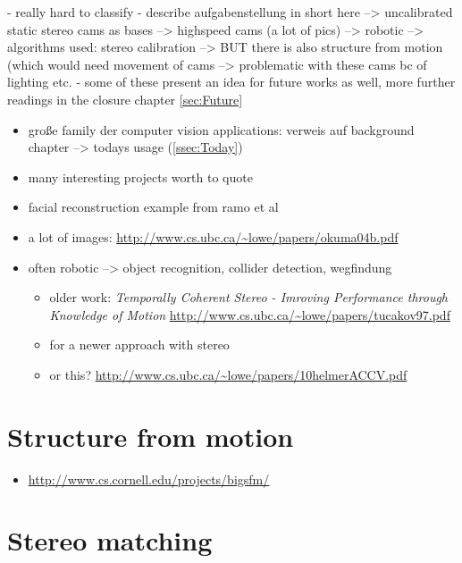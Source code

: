 - really hard to classify
- describe aufgabenstellung in short here --> uncalibrated  static stereo cams as bases --> highspeed cams (a lot of pics) --> robotic --> algorithms used: stereo calibration --> BUT there is also structure from motion (which would need movement of cams --> problematic with these cams bc of lighting etc. 
- some of these present an idea for future works as well, more further readings in the closure chapter \autoref{sec:Future}
\begin{itemize}
\item große family der computer vision applications: verweis auf background chapter --> todays usage (\autoref{ssec:Today})
\item many interesting projects worth to quote
\item facial reconstruction example from ramo et al
\item a lot of images: \cite{Okuma.2004} \url{http://www.cs.ubc.ca/~lowe/papers/okuma04b.pdf}
\item often robotic --> object recognition, collider detection, wegfindung
	\begin{itemize}
	\item older work: \textit{Temporally Coherent Stereo - Imroving Performance through Knowledge of Motion} 	\cite{Tucakov.1997} \url{http://www.cs.ubc.ca/~lowe/papers/tucakov97.pdf}
	\item \cite{Helmer.2010} for a newer approach with stereo
	\item or this? \url{http://www.cs.ubc.ca/~lowe/papers/10helmerACCV.pdf}
	\end{itemize}
\end{itemize}

\section{Structure from motion}

\begin{itemize}
\item \url{http://www.cs.cornell.edu/projects/bigsfm/} 
\end{itemize}

\section{Stereo matching}


